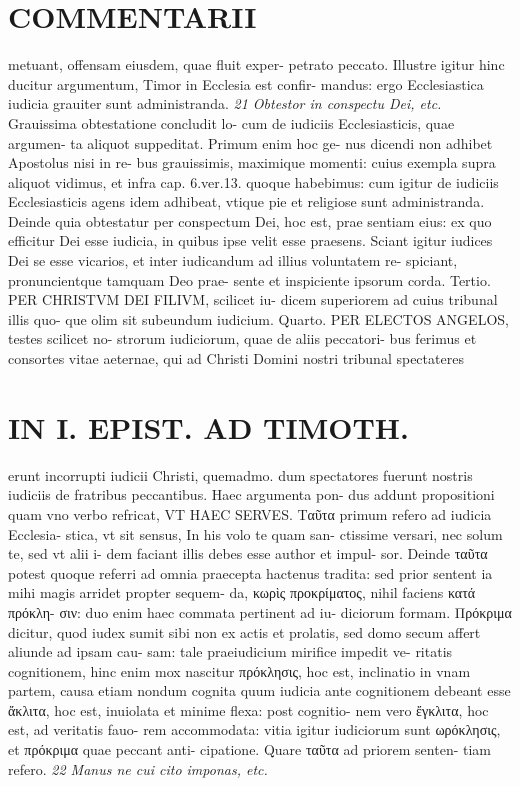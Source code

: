 \documentclass{article}
\begin{document}
\begin{pages}
\section*{COMMENTARII }
\marginpar{[ p.136 ]}\pstart metuant, offensam eiusdem, quae fluit exper- petrato peccato. Illustre igitur hinc ducitur argumentum, Timor in Ecclesia est confir- mandus: ergo Ecclesiastica iudicia grauiter sunt administranda.  \pend
\textit{21 Obtestor in conspectu Dei, etc. }\pstart Grauissima obtestatione concludit lo- cum de iudiciis Ecclesiasticis, quae argumen- ta aliquot suppeditat. Primum enim hoc ge- nus dicendi non adhibet Apostolus nisi in re- bus grauissimis, maximique momenti: cuius exempla supra aliquot vidimus, et infra cap. 6.ver.13. quoque habebimus: cum igitur de iudiciis Ecclesiasticis agens idem adhibeat, vtique pie et religiose sunt administranda. Deinde quia obtestatur per conspectum Dei, hoc est, prae sentiam eius: ex quo efficitur Dei esse iudicia, in quibus ipse velit esse praesens.  \pend\pstart Sciant igitur iudices Dei se esse vicarios, et inter iudicandum ad illius voluntatem re- spiciant, pronuncientque tamquam Deo prae- sente et inspiciente ipsorum corda. Tertio. PER CHRISTVM DEI FILIVM, scilicet iu- dicem superiorem ad cuius tribunal illis quo- que olim sit subeundum iudicium. Quarto. PER ELECTOS ANGELOS, testes scilicet no- strorum iudiciorum, quae de aliis peccatori- bus ferimus et consortes vitae aeternae, qui ad Christi Domini nostri tribunal spectateres  \pend
\section*{IN I. EPIST. AD TIMOTH. }
\marginpar{[ p.137 ]}\pstart erunt incorrupti iudicii Christi, quemadmo. dum spectatores fuerunt nostris iudiciis de fratribus peccantibus. Haec argumenta pon- dus addunt propositioni quam vno verbo refricat, VT HAEC SERVES.  \pend\pstart Ταῦτα primum refero ad iudicia Ecclesia- stica, vt sit sensus, In his volo te quam san- ctissime versari, nec solum te, sed vt alii i- dem faciant illis debes esse author et impul- sor. Deinde ταῦτα potest quoque referri ad omnia praecepta hactenus tradita: sed prior sentent ia mihi magis arridet propter sequem- da,  κωρὶς προκρίματος, nihil faciens κατά πρόκλη- σιν: duo enim haec commata pertinent ad iu- diciorum formam. Πρόκριμα dicitur, quod iudex sumit sibi non ex actis et prolatis, sed domo secum affert aliunde ad ipsam cau- sam: tale praeiudicium mirifice impedit ve- ritatis cognitionem, hinc enim mox nascitur πρόκλησις, hoc est, inclinatio in vnam partem, causa etiam nondum cognita quum iudicia ante cognitionem debeant esse ἄκλιτα, hoc est, inuiolata et minime flexa: post cognitio- nem vero ἔγκλιτα, hoc est, ad veritatis fauo- rem accommodata: vitia igitur iudiciorum sunt ωρόκλησις, et πρόκριμα quae peccant anti- cipatione. Quare ταῦτα ad priorem senten- tiam refero.  \pend
\textit{22 Manus ne cui cito imponas, etc. }

\end{pages}
\end{document}
